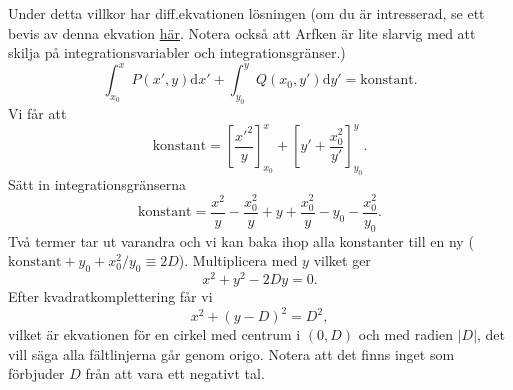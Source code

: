 \documentclass[%
oneside,                 %
final,                   %
10pt]{article}
\newenvironment{notice_mdfboxadmon}[1][]{
\begin{notice_mdfboxmdframed}[frametitle=#1]
}
{
\end{notice_mdfboxmdframed}
}
\begin{document}
\begin{notice_mdfboxadmon}
Under detta villkor har diff.ekvationen lösningen (om du är intresserad, se ett bevis av denna ekvation \href{{http://fy.chalmers.se/subatom/cforssen/vektorfalt/download/arfken_7_10.pdf}}{här}. Notera också att Arfken är lite slarvig med att skilja på integrationsvariabler och integrationsgränser.)
\begin{equation}
\int_{x_0}^x P(x',y) \mbox{d}x' + \int_{y_0}^y Q(x_0,y') \mbox{d}y' = \mathrm{konstant}. 
\end{equation}
Vi får att
\begin{equation}
\mathrm{konstant} = \left[ \frac{x'^2}{y} \right]_{x_0}^x + \left[ y' + \frac{x_0^2}{y'} \right]_{y_0}^y. 
\end{equation}
Sätt in integrationsgränserna
\begin{equation}
\mathrm{konstant} = \frac{x^2}{y} - \frac{x_0^2}{y} + y + \frac{x_0^2}{y} - y_0 - \frac{x_0^2}{y_0}.
\end{equation}
Två termer tar ut varandra och vi kan baka ihop alla konstanter till en ny ($\mathrm{konstant} + y_0 + x_0^2/y_0 \equiv 2D$). Multiplicera med $y$ vilket ger
\begin{equation}
x^2 + y^2 - 2 D y = 0.
\end{equation}
Efter kvadratkomplettering får vi
\begin{equation}
  x^2 + \left(y-D\right)^2 = D^2,
\end{equation}
vilket är ekvationen för en cirkel med centrum i $(0,D)$ och med radien $|D|$, det vill säga alla fältlinjerna går genom origo. Notera att det finns inget som förbjuder $D$ från att vara ett negativt tal.


\end{notice_mdfboxadmon}
\end{document}
